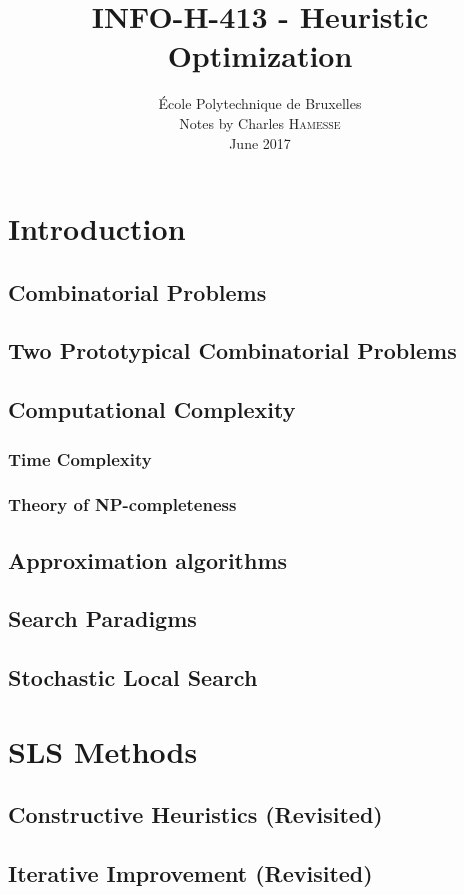 \documentclass[a4paper,10pt]{article}
\title{INFO-H-413 - Heuristic Optimization}
\date{\vspace{-3ex}
École Polytechnique de Bruxelles\\
\vspace{4ex}
Notes by Charles \textsc{Hamesse}\\
\vspace{4ex}June 2017\vspace{4ex}}
\begin{document}
\maketitle
\tableofcontents
\pagebreak
\section{Introduction}
	\subsection{Combinatorial Problems}
	\subsection{Two Prototypical Combinatorial Problems}
	\subsection{Computational Complexity} 
			\subsubsection{Time Complexity}
			\subsubsection{Theory of NP-completeness} 
	\subsection{Approximation algorithms}
	\subsection{Search Paradigms}
	\subsection{Stochastic Local Search}

\section{SLS Methods}
	\subsection{Constructive Heuristics (Revisited)}
	\subsection{Iterative Improvement (Revisited)}
\end{document}
